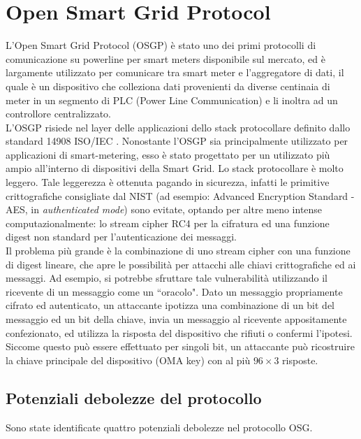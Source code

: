 \section{Open Smart Grid Protocol}
L'Open Smart Grid Protocol (OSGP) è stato uno dei primi protocolli di comunicazione su powerline per smart meters disponibile sul mercato, ed è largamente utilizzato per comunicare tra smart meter e l'aggregatore di dati, il quale è un dispositivo che colleziona dati provenienti da diverse centinaia di meter in un segmento di PLC (Power Line Communication) e li inoltra ad un controllore centralizzato.\\
L'OSGP risiede nel layer delle applicazioni dello stack protocollare definito dallo standard 14908 ISO/IEC \cite{standard14908}. Nonostante l'OSGP sia principalmente utilizzato per applicazioni di smart-metering, esso è stato progettato per un utilizzato più ampio all'interno di dispositivi della Smart Grid. Lo stack protocollare è molto leggero. Tale leggerezza è ottenuta pagando in sicurezza, infatti le primitive crittografiche consigliate dal NIST  (ad esempio: Advanced Encryption Standard - AES, in \emph{authenticated mode}) sono evitate, optando per altre meno intense computazionalmente: lo stream cipher RC4 per la cifratura ed una funzione digest non standard per l'autenticazione dei messaggi.\\
Il problema più grande è la combinazione di uno stream cipher con una funzione di digest lineare, che apre le possibilità per attacchi alle chiavi crittografiche ed ai messaggi. Ad esempio, si potrebbe sfruttare tale vulnerabilità utilizzando il ricevente di un messaggio come un ``oracolo". Dato un messaggio propriamente cifrato ed autenticato, un attaccante ipotizza una combinazione di un bit del messaggio ed un bit della chiave, invia un messaggio al ricevente appositamente confezionato, ed utilizza la risposta del  dispositivo che rifiuti o confermi l'ipotesi. Siccome questo può essere effettuato per singoli bit, un attaccante può ricostruire la chiave principale del dispositivo (OMA key) con al più $96 \times 3$ risposte.
\subsection{Potenziali debolezze del protocollo}
Sono state identificate quattro potenziali debolezze nel protocollo OSG.
